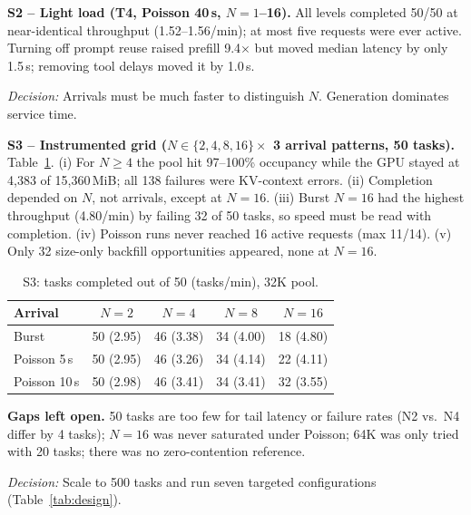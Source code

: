 \documentclass[10pt,twocolumn,letterpaper]{article}
\newcommand{\dec}[1]{\par\noindent\textit{Decision:} #1\par}
\begin{document}
\textbf{S2 -- Light load (T4, Poisson 40\,s, $N{=}1$--16).} All levels completed 50/50 at near-identical throughput (1.52--1.56/min); at most five requests were ever active. Turning off prompt reuse raised prefill 9.4$\times$ but moved median latency by only 1.5\,s; removing tool delays moved it by 1.0\,s.
\dec{Arrivals must be much faster to distinguish $N$. Generation dominates service time.}

\textbf{S3 -- Instrumented grid ($N\in\{2,4,8,16\}\times$ 3 arrival patterns, 50 tasks).} Table~\ref{tab:s3}. (i) For $N\ge4$ the pool hit 97--100\% occupancy while the GPU stayed at 4{,}383 of 15{,}360\,MiB; all 138 failures were KV-context errors. (ii) Completion depended on $N$, not arrivals, except at $N{=}16$. (iii) Burst $N{=}16$ had the highest throughput (4.80/min) by failing 32 of 50 tasks, so speed must be read with completion. (iv) Poisson runs never reached 16 active requests (max 11/14). (v) Only 32 size-only backfill opportunities appeared, none at $N{=}16$.

\begin{table}[h]
\centering\small
\caption{S3: tasks completed out of 50 (tasks/min), 32K pool.}
\label{tab:s3}
\setlength{\tabcolsep}{4pt}
\begin{tabular}{@{}lcccc@{}}
\toprule
Arrival & $N{=}2$ & $N{=}4$ & $N{=}8$ & $N{=}16$\\
\midrule
Burst & 50 (2.95) & 46 (3.38) & 34 (4.00) & 18 (4.80)\\
Poisson 5\,s & 50 (2.95) & 46 (3.26) & 34 (4.14) & 22 (4.11)\\
Poisson 10\,s & 50 (2.98) & 46 (3.41) & 34 (3.41) & 32 (3.55)\\
\bottomrule
\end{tabular}
\end{table}

\textbf{Gaps left open.} 50 tasks are too few for tail latency or failure rates (N2 vs.\ N4 differ by 4 tasks); $N{=}16$ was never saturated under Poisson; 64K was only tried with 20 tasks; there was no zero-contention reference.
\dec{Scale to 500 tasks and run seven targeted configurations (Table~\ref{tab:design}).}
\end{document}
